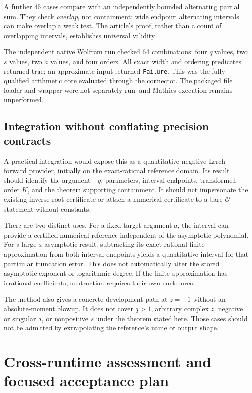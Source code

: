 \documentclass[11pt,a4paper]{article}
\newcommand{\OO}{\mathcal O}
\begin{document}
A further 45 cases compare with an independently bounded alternating partial sum. They check \emph{overlap}, not containment; wide endpoint alternating intervals can make overlap a weak test. The article's proof, rather than a count of overlapping intervals, establishes universal validity.

The independent native Wolfram run checked 64 combinations: four $q$ values, two $s$ values, two $a$ values, and four orders. All exact width and ordering predicates returned true; an approximate input returned \texttt{Failure}. This was the fully qualified arithmetic core evaluated through the connector. The packaged file loader and wrapper were not separately run, and Mathics execution remains unperformed.

\subsection{Integration without conflating precision contracts}
A practical integration would expose this as a quantitative negative-Lerch forward provider, initially on the exact-rational reference domain. Its result should identify the argument $-q$, parameters, interval endpoints, transformed order $K$, and the theorem supporting containment. It should not impersonate the existing inverse root certificate or attach a numerical certificate to a bare $\OO$ statement without constants.

There are two distinct uses. For a fixed target argument $a$, the interval can provide a certified numerical reference independent of the asymptotic polynomial. For a large-$a$ asymptotic result, subtracting its exact rational finite approximation from both interval endpoints yields a quantitative interval for that particular truncation error. This does not automatically alter the stored asymptotic exponent or logarithmic degree. If the finite approximation has irrational coefficients, subtraction requires their own enclosures.

The method also gives a concrete development path at $z=-1$ without an absolute-moment blowup. It does not cover $q>1$, arbitrary complex $z$, negative or singular $a$, or nonpositive $s$ under the theorem stated here. Those cases should not be admitted by extrapolating the reference's name or output shape.

\section{Cross-runtime assessment and focused acceptance plan}
\label{sec:runtime}
\end{document}
